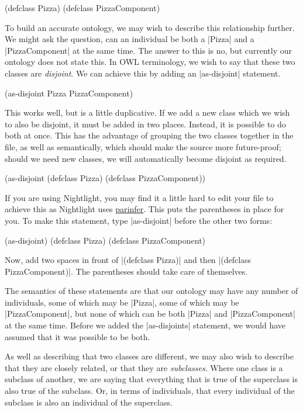 \begin{tawnyexample}
(defclass Pizza)
(defclass PizzaComponent)
\end{tawnyexample}

To build an accurate ontology, we may wish to describe this relationship
further. We might ask the question, can an individual be both a |Pizza|
and a |PizzaComponent| at the same time. The answer to this is no, but
currently our ontology does not state this. In OWL terminology, we wish
to say that these two classes are \emph{disjoint}. We can achieve this by
adding an |as-disjoint| statement.

\begin{tawnyexample}
(as-disjoint Pizza PizzaComponent)
\end{tawnyexample}

This works well, but is a little duplicative. If we add a new class
which we wish to also be disjoint, it must be added in two places.
Instead, it is possible to do both at once. This has the advantage of
grouping the two classes together in the file, as well as semantically,
which should make the source more future-proof; should we need new
classes, we will automatically become disjoint as required.

\begin{tawny}
(as-disjoint
 (defclass Pizza)
 (defclass PizzaComponent))
\end{tawny}

If you are using Nightlight, you may find it a little hard to edit
your file to achieve this as Nightlight uses
\href{http://shaunlebron.github.io/parinfer/}{parinfer}. This puts the
parentheses in place for you. To make this statement, type
|as-disjoint| before the other two forms:

\begin{tawnyexample}
(as-disjoint)
(defclass Pizza)
(defclass PizzaComponent)
\end{tawnyexample}

Now, add two spaces in front of |(defclass Pizza)| and then |(defclass
PizzaComponent)|. The parentheses should take care of themselves.

The semantics of these statements are that our ontology may have any
number of individuals, some of which may be |Pizza|, some of which may
be |PizzaComponent|, but none of which can be both |Pizza| and
|PizzaComponent| at the same time. Before we added the |as-disjoints|
statement, we would have assumed that it was possible to be both.

As well as describing that two classes are different, we may also wish
to describe that they are closely related, or that they are
\emph{subclasses}. Where one class is a subclass of another, we are saying
that everything that is true of the superclass is also true of the
subclass. Or, in terms of individuals, that every individual of the
subclass is also an individual of the superclass.

